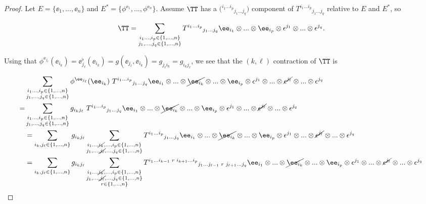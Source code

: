 \begin{proof}
     Let $E = \{\ee_1, ..., \ee_n\}$ and $E^* = \{\phi^{\ee_1}, ..., \phi^{\ee_n}\}$. Assume $\TT$ has a $\Big( {}^{i_1 ... i_p}{}_{j_1 ... j_q} \Big)$ component of $T^{i_1 ... i_p}{}_{j_1 ... j_q}$ relative to $E$ and $E^*$, so
     
    \begin{align*}
        \TT = \sum_{\substack{i_1 ..., i_p \in \{1, ..., n\} \\ j_1, ..., j_q \in \{1, ..., n\}}} T^{i_1 ... i_p}{}_{j_1 ... j_q} \ee_{i_1} \otimes ... \otimes \ee_{i_p} \otimes \epsilon^{j_1} \otimes ... \otimes \epsilon^{j_q}.
    \end{align*}
     
    Using that $\phi^{\ee_{j_\ell}}(\ee_{i_k}) = \ee_{j_\ell}^\flat(\ee_{i_k}) = g(\ee_{j_\ell}, \ee_{i_k}) = g_{j_\ell i_k} = g_{i_k j_\ell}$, we see that the $(k, \ell)$ contraction of $\TT$ is
    
    \begin{align*}
        &\sum_{\substack{i_1 ..., i_p \in \{1, ..., n\} \\ j_1, ..., j_q \in \{1, ..., n\}}} \phi^{\ee_{j_\ell}}(\ee_{i_k}) \spc T^{i_1 ... i_p}{}_{j_1 ... j_q} \ee_{i_1} \otimes ... \otimes \cancel{\ee_{i_k}} \otimes ... \otimes \ee_{i_p} \otimes \epsilon^{j_1} \otimes ... \otimes \cancel{\epsilon^{j_\ell}} \otimes... \otimes \epsilon^{j_q} 
        \\
        = &\sum_{\substack{i_1 ..., i_p \in \{1, ..., n\} \\ j_1, ..., j_q \in \{1, ..., n\}}} g_{i_k j_\ell} \spc T^{i_1 ... i_p}{}_{j_1 ... j_q} \ee_{i_1} \otimes ... \otimes \cancel{\ee_{i_k}} \otimes ... \otimes \ee_{i_p} \otimes \epsilon^{j_1} \otimes ... \otimes \cancel{\epsilon^{j_\ell}} \otimes... \otimes \epsilon^{j_q} 
        \\
        &= \sum_{i_k, j_\ell \in \{1, ..., n\}} g_{i_k j_\ell} \sum_{\substack{i_1 ..., \cancel{i_k}, ..., i_p \in \{1, ..., n\} \\ j_1, ..., \cancel{j_\ell}, ..., j_q \in \{1, ..., n\}}} T^{i_1 ... i_p}{}_{j_1 ... j_q} \ee_{i_1} \otimes ... \otimes \cancel{\ee_{i_k}} \otimes ... \otimes \ee_{i_p} \otimes \epsilon^{j_1} \otimes ... \otimes \cancel{\epsilon^{j_\ell}} \otimes... \otimes \epsilon^{j_q} 
        \\
        &= \sum_{i_k, j_\ell \in \{1, ..., n\}} g_{i_k j_\ell} \sum_{\substack{i_1 ..., \cancel{i_k}, ..., i_p \in \{1, ..., n\} \\ j_1, ..., \cancel{j_\ell}, ..., j_q \in \{1, ..., n\} \\ r \in \{1, ..., n\}}} T^{i_1 ... i_{k - 1} \spc r \spc i_{k + 1} ... i_p}{}_{j_1 ... j_{\ell - 1} \spc r \spc j_{\ell + 1} ... j_q} \ee_{i_1} \otimes ... \otimes \cancel{\ee_{i_k}} \otimes ... \otimes \ee_{i_p} \otimes \epsilon^{j_1} \otimes ... \otimes \cancel{\epsilon^{j_\ell}} \otimes... \otimes \epsilon^{j_q} 
    \end{align*}
        

\end{proof}

